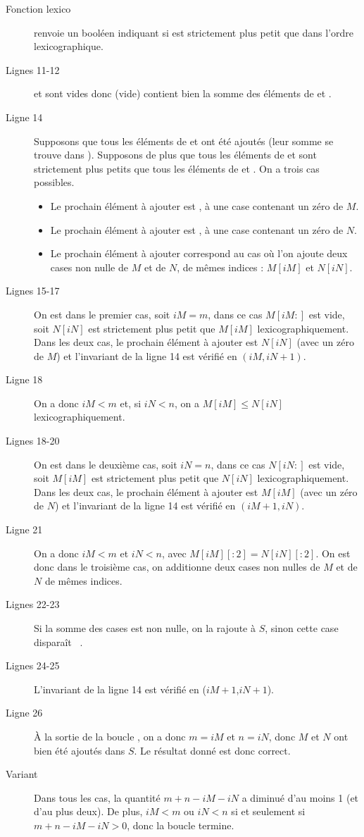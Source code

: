 \begin{description}
  \item[Fonction lexico]  renvoie un booléen indiquant si  est strictement plus petit que  dans l'ordre lexicographique.
  \item[Lignes 11-12]  et  sont vides donc  (vide) contient bien la somme des éléments de  et .
  \item[Ligne 14] Supposons que tous les éléments de  et  ont été ajoutés (leur somme se trouve dans ). 
    Supposons de plus que tous les éléments de  et  sont strictement plus petits que tous les éléments de  et .
    On a trois cas possibles.
    \begin{itemize}
      \item Le prochain élément à ajouter est , à une case contenant un zéro de $M$.
      \item Le prochain élément à ajouter est , à une case contenant un zéro de $N$.
      \item Le prochain élément à ajouter correspond au cas où l'on ajoute deux cases non nulle de $M$ et de $N$, de mêmes indices : $M[iM]$ et $N[iN]$. 
    \end{itemize}
  \item[Lignes 15-17] On est dans le premier cas, soit $iM = m$, dans ce cas $M[iM:]$ est vide, soit $N[iN]$ est strictement plus petit que $M[iM]$ lexicographiquement. 
    Dans les deux cas, le prochain élément à ajouter est $N[iN]$ (avec un zéro de $M$) et l'invariant de la ligne 14 est vérifié en $(iM,iN+1)$.
  \item[Ligne 18] On a donc $iM < m$ et, si $iN < n$, on a $M[iM] \leq N[iN]$ lexicographiquement. 
  \item[Lignes 18-20] On est dans le deuxième cas, soit $iN = n$, dans ce cas $N[iN:]$ est vide, soit $M[iM]$ est strictement plus petit que $N[iN]$ lexicographiquement. 
    Dans les deux cas, le prochain élément à ajouter est $M[iM]$ (avec un zéro de $N$) et l'invariant de la ligne 14 est vérifié en $(iM+1,iN)$.
  \item[Ligne 21] On a donc $iM < m$ et $iN < n$, avec $M[iM][:2]  = N[iN][:2]$. On est donc dans le troisième cas, on additionne deux cases non nulles de $M$ et de $N$ de mêmes indices.
  \item[Lignes 22-23] Si la somme des cases est non nulle, on la rajoute à $S$, sinon cette case  \og disparaît \fg\ . 
  \item[Lignes 24-25] L'invariant de la ligne 14 est vérifié en ($iM+1$,$iN+1$).
  \item[Ligne 26] \`A la sortie de la boucle , on a donc $m = iM$ et $n = iN$, donc $M$ et $N$ ont bien été ajoutés dans $S$. Le résultat donné est donc correct. 
  \item[Variant] Dans tous les cas, la quantité $m+n-iM-iN$ a diminué d'au moins 1 (et d'au plus deux). De plus, $iM < m$ ou $iN < n$ si et seulement si $m+n-iM-iN > 0$, donc la boucle  termine. 
\end{description}

